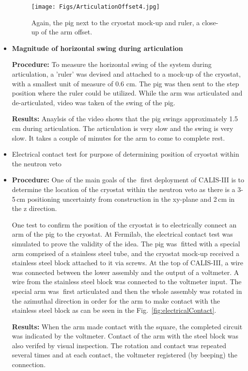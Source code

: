 \begin{itemize}
\begin{figure}[htbp]
 \centering
 \texttt{[image: Figs/ArticulationOffset4.jpg]}
 \caption{Again, the pig next to the cryostat mock-up and ruler, a close-up of the arm offset.}
 \label{fig:art_offset4}
\end{figure}

\item{\bf Magnitude of horizontal swing during articulation}

{\bf Procedure:} To measure the horizontal swing of the system during articulation, a 'ruler' was devised and
attached to a mock-up of the cryostat, with a smallest unit of measure of 0.6 cm. The pig was then sent to
the step position where the ruler could be utilized. While the arm was articulated and de-articulated, video
was taken of the swing of the pig.

{\bf Results:}  Anaylsis of the video shows that the pig swings approximately 1.5\,cm during articulation. The articulation is very slow and the swing is very slow. It takes a couple of minutes for the arm to come to complete rest.
    
 \item{Electrical contact test for purpose of determining position of cryostat within the neutron veto}
  
\item{\bf Procedure:} One of the main goals of the first deployment of CALIS-III is to determine the location of the cryostat within the neutron veto as there is a 3-5\,cm positioning uncertainty from construction in the xy-plane and 2\,cm in the z direction.

One test to confirm the position of the cryostat is to electrically connect an arm of the pig to the cryostat. At Fermilab, the electrical contact test was simulated to prove the validity of the idea. The pig was fitted
with a special arm comprised of a stainless steel tube, and the cryostat mock-up received a stainless steel
block attached to it via screws. At the top of CALIS-III, a wire was connected between the lower assembly
and the output of a voltmeter. A wire from the stainless steel block was connected to the voltmeter input. The special arm was first articulated and then the whole assembly was rotated in the azimuthal direction in
order for the arm to make contact with the stainless steel block as can be seen in the Fig.~\ref{fig:electricalContact}.

{\bf Results:} When the arm made contact with the square, the completed circuit was indicated by the
voltmeter. Contact of the arm with the steel block was also verifed by visual inspection. The rotation and
contact was repeated several times and at each contact, the voltmeter registered (by beeping) the connection.


\end{itemize}
